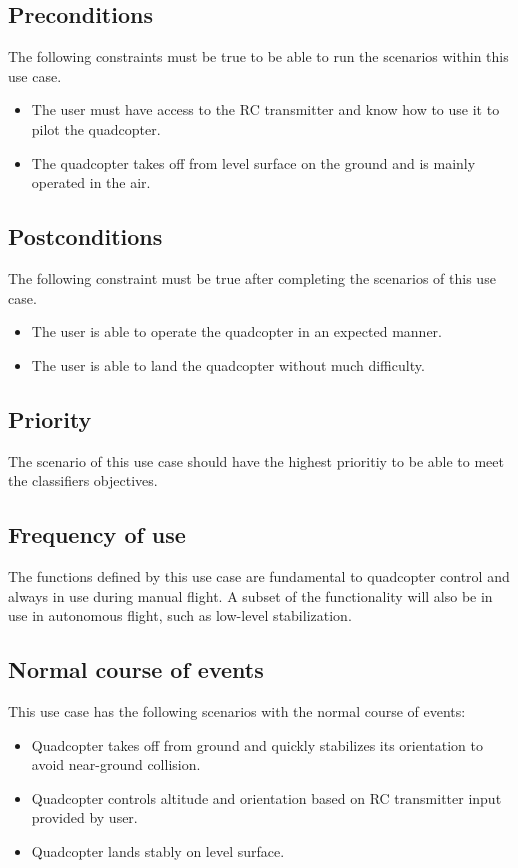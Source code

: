 \documentclass[a4paper]{article}
\begin{document}
\subsection{Preconditions}
The following constraints must be true to be able to run the scenarios within this use case.
\begin{itemize}
	\item The user must have access to the RC transmitter and know how to use it to pilot the quadcopter.
	\item The quadcopter takes off from level surface on the ground and is mainly operated in the air.
\end{itemize}

\subsection{Postconditions}
The following constraint must be true after completing the scenarios of this use case.
\begin{itemize}
	\item The user is able to operate the quadcopter in an expected manner.
	\item The user is able to land the quadcopter without much difficulty.
\end{itemize}

\subsection{Priority}
The scenario of this use case should have the highest prioritiy to be able to meet the classifiers objectives.

\subsection{Frequency of use}
The functions defined by this use case are fundamental to quadcopter control and always in use during manual flight. A subset of the functionality will also be in use in autonomous flight, such as low-level stabilization.

\subsection{Normal course of events}
This use case has the following scenarios with the normal course of events:
\begin{itemize}
	\item Quadcopter takes off from ground and quickly stabilizes its orientation to avoid near-ground collision.
	\item Quadcopter controls altitude and orientation based on RC transmitter input provided by user.
	\item Quadcopter lands stably on level surface.
\end{itemize}
\end{document}
